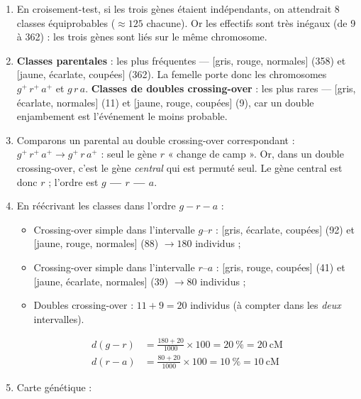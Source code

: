 \documentclass[11pt]{article}
\newcommand{\cle}[1]{{\popxbold\color{popdark}#1}}
\begin{document}
\begin{corrige}
\begin{enumerate}
\item En croisement-test, si les trois gènes étaient indépendants, on attendrait 8 classes équiprobables ($\approx 125$ chacune). Or les effectifs sont très inégaux (de 9 à 362) : les trois gènes sont \cle{liés} sur le même chromosome.
\item \textbf{Classes parentales} : les plus fréquentes — [gris, rouge, normales] (358) et [jaune, écarlate, coupées] (362). La femelle porte donc les chromosomes $g^+\,r^+\,a^+$ et $g\,r\,a$. \textbf{Classes de doubles crossing-over} : les plus rares — [gris, écarlate, normales] (11) et [jaune, rouge, coupées] (9), car un double enjambement est l'événement le moins probable.
\item Comparons un parental au double crossing-over correspondant : $g^+\,r^+\,a^+ \rightarrow g^+\,r\,a^+$ : seul le gène $r$ « change de camp ». Or, dans un double crossing-over, c'est le gène \emph{central} qui est permuté seul. Le gène central est donc $r$ ; l'ordre est \textbf{$g$ — $r$ — $a$}.
\item En réécrivant les classes dans l'ordre $g-r-a$ :
\begin{itemize}
\item Crossing-over simple dans l'intervalle $g$--$r$ : [gris, écarlate, coupées] (92) et [jaune, rouge, normales] (88) $\rightarrow 180$ individus ;
\item Crossing-over simple dans l'intervalle $r$--$a$ : [gris, rouge, coupées] (41) et [jaune, écarlate, normales] (39) $\rightarrow 80$ individus ;
\item Doubles crossing-over : $11 + 9 = 20$ individus (à compter dans les \emph{deux} intervalles).
\end{itemize}
\begin{align*}
d(g-r) &= \frac{180 + 20}{1000} \times 100 = 20~\% = 20~\text{cM} \\
d(r-a) &= \frac{80 + 20}{1000} \times 100 = 10~\% = 10~\text{cM}
\end{align*}
\item Carte génétique :
\begin{popfigure}
\end{popfigure}
\end{enumerate}
\end{corrige}
\end{document}
